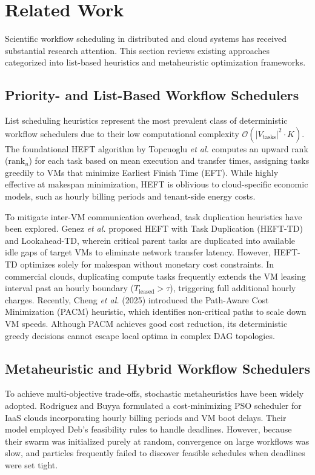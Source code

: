 \documentclass[journal]{IEEEtran}
\begin{document}
\section{Related Work}
Scientific workflow scheduling in distributed and cloud systems has received substantial research attention. This section reviews existing approaches categorized into list-based heuristics and metaheuristic optimization frameworks.

\subsection{Priority- and List-Based Workflow Schedulers}
List scheduling heuristics represent the most prevalent class of deterministic workflow schedulers due to their low computational complexity $\mathcal{O}(|V_{\text{tasks}}|^2 \cdot K)$. The foundational HEFT algorithm by Topcuoglu \textit{et al.} \cite{topcuoglu2002heft} computes an upward rank ($\text{rank}_u$) for each task based on mean execution and transfer times, assigning tasks greedily to VMs that minimize Earliest Finish Time (EFT). While highly effective at makespan minimization, HEFT is oblivious to cloud-specific economic models, such as hourly billing periods and tenant-side energy costs.

To mitigate inter-VM communication overhead, task duplication heuristics have been explored. Genez \textit{et al.} \cite{genez2018heft} proposed HEFT with Task Duplication (HEFT-TD) and Lookahead-TD, wherein critical parent tasks are duplicated into available idle gaps of target VMs to eliminate network transfer latency. However, HEFT-TD optimizes solely for makespan without monetary cost constraints. In commercial clouds, duplicating compute tasks frequently extends the VM leasing interval past an hourly boundary ($T_{\text{leased}} > \tau$), triggering full additional hourly charges. Recently, Cheng \textit{et al.} (2025) \cite{cheng2025pacm} introduced the Path-Aware Cost Minimization (PACM) heuristic, which identifies non-critical paths to scale down VM speeds. Although PACM achieves good cost reduction, its deterministic greedy decisions cannot escape local optima in complex DAG topologies.

\subsection{Metaheuristic and Hybrid Workflow Schedulers}
To achieve multi-objective trade-offs, stochastic metaheuristics have been widely adopted. Rodriguez and Buyya \cite{rodriguez2014cost} formulated a cost-minimizing PSO scheduler for IaaS clouds incorporating hourly billing periods and VM boot delays. Their model employed Deb's feasibility rules to handle deadlines. However, because their swarm was initialized purely at random, convergence on large workflows was slow, and particles frequently failed to discover feasible schedules when deadlines were set tight.
\end{document}
